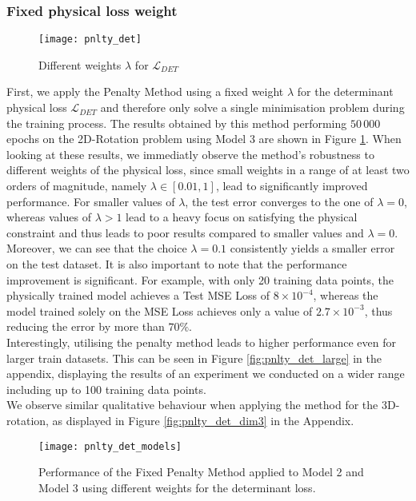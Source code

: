 \subsubsection{Fixed physical loss weight}
\begin{figure}[h]
	\texttt{[image: pnlty\_det]}
	\caption{Different weights $\lambda$ for $\mathcal{L}_{DET}$}
	\label{fig:pnlty_det}
\end{figure}
First, we apply the Penalty Method using a fixed weight $\lambda$ for the determinant physical loss $\mathcal{L}_{DET}$ and therefore only solve a single minimisation problem during the training process. The results obtained by this method performing $50\,000$ epochs on the 2D-Rotation problem using Model 3 are shown in Figure \ref{fig:pnlty_det}. When looking at these results, we immediatly observe the method's robustness to different weights of the physical loss, since small weights in a range of at least two orders of magnitude, namely $\lambda \in [0.01, 1]$, lead to significantly improved performance. For smaller values of $\lambda$, the test error converges to the one of $\lambda= 0$, whereas values of $\lambda > 1$ lead to a heavy focus on satisfying the physical constraint and thus leads to poor results compared to smaller values and $\lambda=0$.\\
\indent Moreover, we can see that the choice $\lambda = 0.1$ consistently yields a smaller error on the test dataset. It is also important to note that the performance improvement is significant. For example, with only 20 training data points, the physically trained model achieves a Test MSE Loss of $8\times10^{-4}$, whereas the model trained solely on the MSE Loss achieves only a value of $2.7\times10^{-3}$, thus reducing the error by more than $70\%$. \\
\indent Interestingly, utilising the penalty method leads to higher performance even for larger train datasets. This can be seen in Figure \ref{fig:pnlty_det_large} in the appendix, displaying the results of an experiment we conducted on a wider range including up to 100 training data points.\\
We observe similar qualitative behaviour when applying the method for the 3D-rotation, as displayed in Figure \ref{fig:pnlty_det_dim3} in the Appendix.\\
\begin{figure}[H]
	\texttt{[image: pnlty\_det\_models]}
	\caption{Performance of the Fixed Penalty Method applied to Model 2 and Model 3 using different weights for the determinant loss.}
	\label{fig:pnlty_det_models}
\end{figure}
